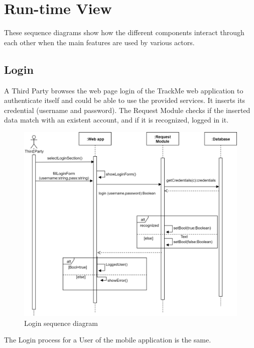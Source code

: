 \section{Run-time View}
These sequence diagrams show how the different components interact through each other when the main features are used by various actors.
\subsection{Login}
A Third Party browses the web page login of the TrackMe web application to authenticate itself and could be able to use the provided services. It inserts its credential (username and password). The Request Module checks if the inserted data match with an existent account, and if it is recognized, logged in it.
\begin{figure}[H]
    \centering
    \includegraphics[scale=0.35]{DD/Pictures/login.png}
    \caption{Login sequence diagram}
\end{figure}
The Login process for a User of the mobile application is the same.
